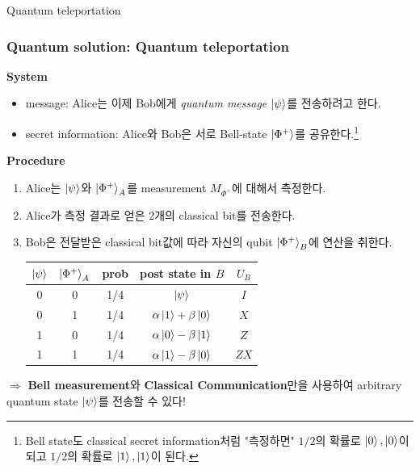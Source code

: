 \documentclass[9pt]{beamer}
\begin{document}
\begin{section}{Quantum teleportation}
        \begin{frame}
            \frametitle{Quantum solution: Quantum teleportation}
            \textbf{System}
            \begin{itemize}
                \item message: Alice는 이제 Bob에게 \textit{quantum message} $\ket{\psi}$를 전송하려고 한다.
                \item secret information: Alice와 Bob은 서로 Bell-state $\ket{\Phi^+}$를 공유한다.\footnote{Bell state도 classical secret information처럼 "측정하면" $1/2$의 확률로 $\ket 0, \ket 0$이 되고 $1/2$의 확률로 $\ket 1, \ket 1$이 된다.}
            \end{itemize}
            \vspace{0.4cm}
            \textbf{Procedure}
            \begin{enumerate}
                \item Alice는 $\ket \psi$와 $\ket{\Phi^+}_A$를 measurement $M_{\Phi^+}$에 대해서 측정한다.
                \item Alice가 측정 결과로 얻은 2개의 classical bit를 전송한다.
                \item Bob은 전달받은 classical bit값에 따라 자신의 qubit $\ket{\Phi^+}_B$에 연산을 취한다.
                \begin{table}[]
                    \begin{tabular}{ccccc}
                        $\ket{\psi}$ &$\ket{\Phi^+}_A$ & prob &post state in $B$ &$U_B$\\\hline
                        0 & 0 & 1/4  & $\ket{\psi}$ & $I$ \\
                        0 & 1 & 1/4  & $\alpha \ket 1 + \beta \ket 0$ & $X$\\
                        1 & 0 & 1/4  & $\alpha \ket 0 - \beta \ket 1$ & $Z$\\
                        1 & 1 & 1/4  & $\alpha \ket 1 - \beta \ket 0$ & $ZX$ 
                    \end{tabular}
                    \end{table}
            \end{enumerate}
            $\Rightarrow$ \textbf{Bell measurement}와 \textbf{Classical Communication}만을 사용하여 arbitrary quantum state $\ket \psi$를 전송할 수 있다!
        \end{frame}
    \end{section}
\end{document}
